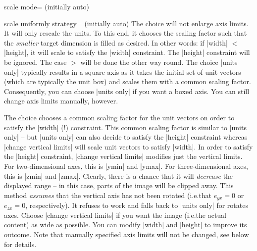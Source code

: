 \begin{pgfplotskey}{scale mode= (initially auto)}
\begin{pgfplotskey}{scale uniformly strategy= (initially auto)%
    }
        The choice  will not enlarge axis limits. It
        will only rescale the units. To this end, it chooses the scaling factor
        such that the \emph{smaller} target dimension is filled as desired. In
        other words: if |width| $<$ |height|, it will scale to satisfy the
        |width| constraint. The |height| constraint will be ignored. The case
        $>$ will be done the other way round. The choice |units only| typically
        results in a square axis as it takes the initial set of unit vectors
        (which are typically the unit box) and scales them with a common
        scaling factor. Consequently, you can choose |units only| if you want a
        boxed axis. You can still change axis limits manually, however.

        The choice  chooses a common
        scaling factor for the unit vectors on order to satisfy the |width| (!)
        constraint. This common scaling factor is similar to |units only| --
        but |units only| can also decide to satisfy the |height| constraint
        whereas |change vertical limits| will scale unit vectors to satisfy
        |width|. In order to satisfy the |height| constraint,
        |change vertical limits| modifies just the vertical limits. For
        two-dimensional axes, this is |ymin| and |ymax|. For three-dimensional
        axes, this is |zmin| and |zmax|. Clearly, there is a chance that it
        will \emph{decrease} the displayed range -- in this case, parts of the
        image will be clipped away. This method \emph{assumes} that the
        vertical axis has not been rotated (i.e.\@ that $e_{yx}=0$ or
        $e_{zx}=0$, respectively). It refuses to work and falls back to
        |units only| for rotates axes. Choose |change vertical limits| if you
        want the image (i.e.\@ the actual content) as wide as possible. You can
        modify |width| and |height| to improve its outcome. Note that manually
        specified axis limits will not be changed, see below for details.


\end{pgfplotskey}
\end{pgfplotskey}
